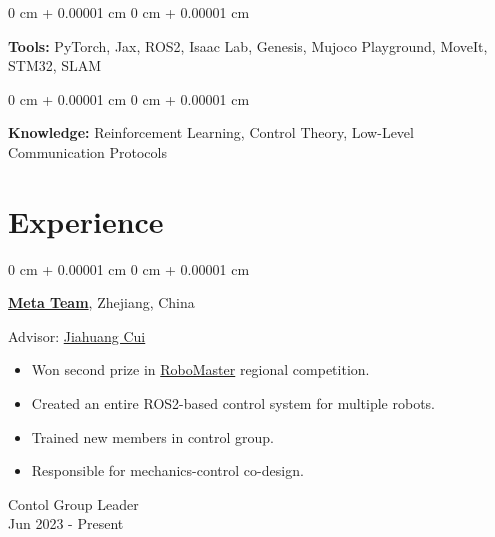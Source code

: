 \documentclass[10pt, letterpaper]{article}
\newenvironment{highlights}{
    \begin{itemize}[
        topsep=0.10 cm,
        parsep=0.10 cm,
        partopsep=0pt,
        itemsep=0pt,
        leftmargin=0 cm + 10pt
    ]
}{
    \end{itemize}
} %
\newenvironment{onecolentry}{
    \begin{adjustwidth}{
        0 cm + 0.00001 cm
    }{
        0 cm + 0.00001 cm
    }
}{
    \end{adjustwidth}
} %
\newenvironment{twocolentry}[2][]{
    \onecolentry
    \def\secondColumn{#2}
    \setcolumnwidth{\fill, 4.5 cm}
    \begin{paracol}{2}
}{
    \switchcolumn \raggedleft \secondColumn
    \end{paracol}
    \endonecolentry
} %
\begin{document}
        \vspace{0.2 cm}

        \begin{onecolentry}
            \textbf{Tools:} PyTorch, Jax, ROS2, Isaac Lab, Genesis, Mujoco Playground, MoveIt, STM32, SLAM
        \end{onecolentry}

        \vspace{0.2 cm}

        \begin{onecolentry}
            \textbf{Knowledge:} Reinforcement Learning, Control Theory, Low-Level Communication Protocols
        \end{onecolentry}
    
    \section{Experience}

        \begin{twocolentry}{
            Contol Group Leader \\
            Jun 2023 - Present
        }
            \href{https://github.com/Meta-Team/Meta-ROS}{\textbf{Meta Team}}, Zhejiang, China

            \vspace{0.10 cm}

            Advisor: \href{https://mechse.illinois.edu/people/profile/zjui-cui}{Jiahuang Cui}
            \begin{highlights}
                \item Won second prize in \href{https://www.robomaster.com/en-US}{RoboMaster} regional competition.
                \item Created an entire ROS2-based control system for multiple robots.
                \item Trained new members in control group.
                \item Responsible for mechanics-control co-design.
            \end{highlights}
        \end{twocolentry}

        \vspace{0.2 cm}
\end{document}
